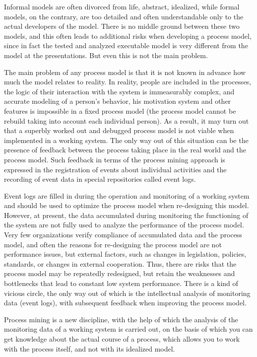 \documentclass[
11pt,%
tightenlines,%
twoside,%
onecolumn,%
nofloats,%
nobibnotes,%
nofootinbib,%
superscriptaddress,%
noshowpacs,%
centertags]%
{revtex4}
\begin{document}
Informal models are often divorced from life, abstract, idealized, while formal models, on the contrary, are too detailed and often understandable only to the actual developers of the model.
There is no middle ground between these two models, and this often leads to additional risks when developing a process model, since in fact the tested and analyzed executable model is very different from the model at the presentations.
But even this is not the main problem.

The main problem of any process model is that it is not known in advance how much the model relates to reality.
In reality, people are included in the processes, the logic of their interaction with the system is immeasurably complex, and accurate modeling of a person’s behavior, his motivation system and other features is impossible in a fixed process model (the process model cannot be rebuild taking into account each individual person).
As a result, it may turn out that a superbly worked out and debugged process model is not viable when implemented in a working system.
The only way out of this situation can be the presence of feedback between the process taking place in the real world and the process model.
Such feedback in terms of the process mining approach is expressed in the registration of events about individual activities and the recording of event data in special repositories called event logs.

Event logs are filled in during the operation and monitoring of a working system and should be used to optimize the process model when re-designing this model.
However, at present, the data accumulated during monitoring the functioning of the system are not fully used to analyze the performance of the process model.
Very few organizations verify compliance of accumulated data and the process model, and often the reasons for re-designing the process model are not performance issues, but external factors, such as changes in legislation, policies, standards, or changes in external cooperation.
Thus, there are risks that the process model may be repeatedly redesigned, but retain the weaknesses and bottlenecks that lead to constant low system performance.
There is a kind of vicious circle, the only way out of which is the intellectual analysis of monitoring data (event logs), with subsequent feedback when improving the process model.

Process mining is a new discipline, with the help of which the analysis of the monitoring data of a working system is carried out, on the basis of which you can get knowledge about the actual course of a process, which allows you to work with the process itself, and not with its idealized model.
\end{document}
